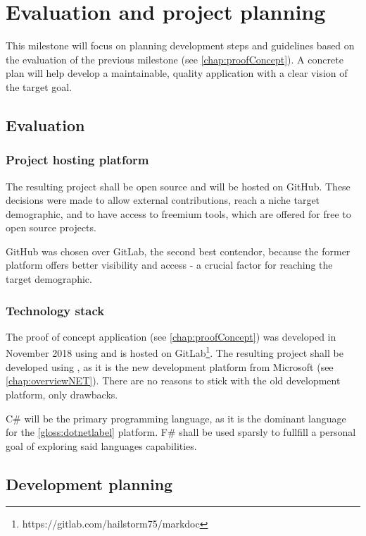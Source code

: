 \chapter{Evaluation and project planning} \label{chap:evalProjPlan}

This milestone will focus on planning development steps and guidelines based on the evaluation of the previous milestone (see \ref{chap:proofConcept}).
A concrete plan will help develop a maintainable, quality application with a clear vision of the target goal.

\section{Evaluation}

\subsection{Project hosting platform}

The resulting project shall be open source and will be hosted on GitHub.
These decisions were made to allow external contributions, reach a niche target demographic, and to have access to freemium tools, which are offered for free to open source projects.

GitHub was chosen over GitLab, the second best contendor, because the former platform offers better visibility and access - a crucial factor for reaching the target demographic.

\subsection{Technology stack}

The proof of concept application (see \ref{chap:proofConcept}) was developed in November 2018 using  and is hosted on GitLab\footnote{https://gitlab.com/hailstorm75/markdoc}. The resulting project shall be developed using , as it is the new development platform from Microsoft (see \ref{chap:overviewNET}). There are no reasons to stick with the old development platform, only drawbacks.

C\# will be the primary programming language, as it is the dominant language for the \ref{gloss:dotnetlabel} platform.
F\# shall be used sparsly to fullfill a personal goal of exploring said languages capabilities.

\section{Development planning}

